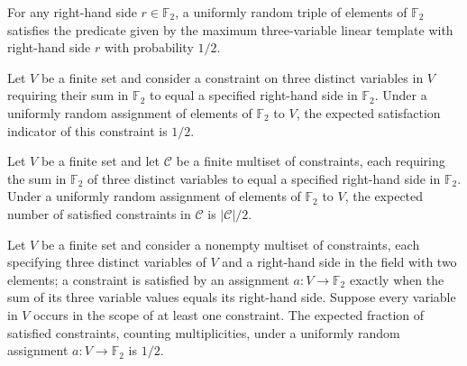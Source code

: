 \begin{theorem}
\label{FABL.expect_e3LinPredicate}
\leanok
{}
For any right-hand side $r\in\mathbb{F}_2$, a uniformly random triple of elements of
$\mathbb{F}_2$ satisfies the predicate given by the maximum three-variable linear
template with right-hand side $r$ with probability $1/2$.
\end{theorem}

\begin{theorem}
\label{FABL.expect_satisfiedIndicator_maxE3Lin}
\leanok
{}
Let $V$ be a finite set and consider a constraint on three distinct variables in $V$
requiring their sum in $\mathbb{F}_2$ to equal a specified right-hand side in
$\mathbb{F}_2$. Under a uniformly random assignment of elements of $\mathbb{F}_2$ to
$V$, the expected satisfaction indicator of this constraint is $1/2$.
\end{theorem}

\begin{theorem}
\label{FABL.expect_satisfiedIndicators_maxE3Lin}
\leanok
{}
Let $V$ be a finite set and let $\mathcal{C}$ be a finite multiset of constraints, each
requiring the sum in $\mathbb{F}_2$ of three distinct variables to equal a specified
right-hand side in $\mathbb{F}_2$. Under a uniformly random assignment of elements of
$\mathbb{F}_2$ to $V$, the expected number of satisfied constraints in $\mathcal{C}$ is
$|\mathcal{C}|/2$.
\end{theorem}

\begin{theorem}
\label{FABL.expect_value_maxE3Lin}
\leanok
{}
Let $V$ be a finite set and consider a nonempty multiset of constraints, each specifying
three distinct variables of $V$ and a right-hand side in the field with two elements; a
constraint is satisfied by an assignment $a:V\to\mathbb{F}_2$ exactly when the sum of
its three variable values equals its right-hand side. Suppose every variable in $V$
occurs in the scope of at least one constraint. The expected fraction of satisfied
constraints, counting multiplicities, under a uniformly random assignment
$a:V\to\mathbb{F}_2$ is $1/2$.
\end{theorem}

